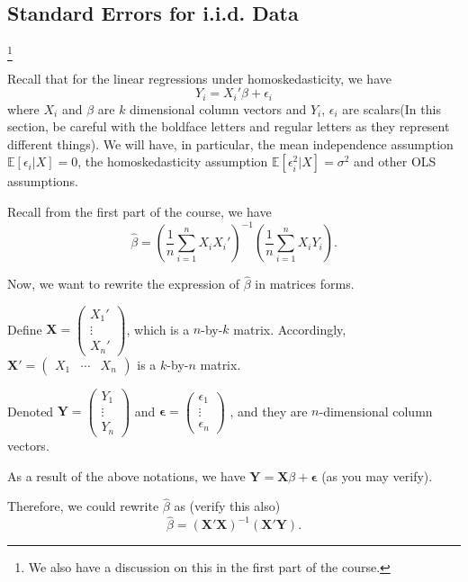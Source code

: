 \documentclass[11pt,a4paper]{amsart}
\theoremstyle{plain}
\theoremstyle{definition}
\begin{document}
\subsection{Standard Errors for i.i.d. Data}\footnote{We also have a discussion on this in the first part of the course.}\hfill\par 
	Recall that for the linear regressions under homoskedasticity, we have 
	\[	Y_{i} = X_{i}'\beta + \epsilon_{i}	\]
	 where $X_{i}$ and $\beta$ are $k$ dimensional column vectors and $Y_{i}$, $\epsilon_{i}$ are scalars(In this section, be careful with the boldface letters and regular letters as they represent different things). We will have, in particular, the mean independence assumption $\mathbb{E}[\epsilon_{i} | X] = 0$, the homoskedasticity assumption  $\mathbb{E}[\epsilon_{i}^{2} | X] = \sigma^{2}$ and other OLS assumptions.  \par
	 Recall from the first part of the course, we have 
	 \[	\hat{\beta} = \left(\frac{1}{n}\sum_{i=1}^{n}X_{i}X_{i}'\right)^{-1}  \left(\frac{1}{n}\sum_{i=1}^{n}X_{i}Y_{i}\right).	\]
	 
	 Now, we want to rewrite the expression of $\hat{\beta}$ in matrices forms. \par 
	 Define $\bm{X} = \begin{pmatrix}
	 X_{1}' \\
	 \vdots \\
	 X_{n}'
	 \end{pmatrix}$, which is a $n$-by-$k$ matrix. Accordingly, $\bm{X}' = \begin{pmatrix}
	 X_{1} & \cdots & X_{n}
	 \end{pmatrix}$
	 is a $k$-by-$n$ matrix. \par 
	 Denoted $\bm{Y} = \begin{pmatrix}
	 	Y_{1} \\
	 	\vdots \\
	 	Y_{n}
	 \end{pmatrix}$ and $\bm{\epsilon} = \begin{pmatrix}
	 \epsilon_{1} \\
	 \vdots \\
	 \epsilon_{n}
	 \end{pmatrix}$ , and they are $n$-dimensional column vectors. \par 
	 As a result of the above notations, we have $\bm{Y} = \bm{X}\beta + \bm{\epsilon}$ (as you may verify).\par 
	 Therefore, we could rewrite $\hat{\beta}$ as (verify this also)
	 \begin{equation}\label{ols, matrices}
	 	\hat{\beta} = \left(\bm{X}'\bm{X}\right)^{-1}\left(\bm{X}' \bm{Y}\right).
	 \end{equation}
	 
\end{document}
